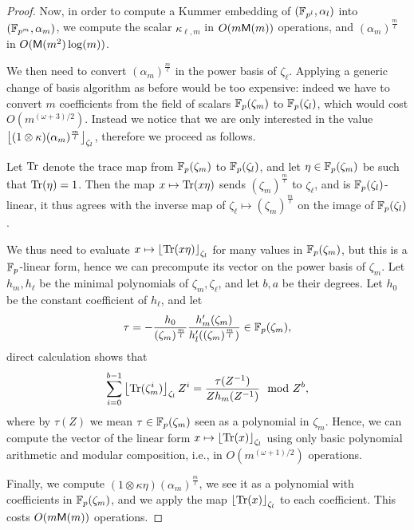 \documentclass[sigconf]{acmart}
\begin{document}
\begin{proof}
  Now, in order to compute a Kummer embedding of $(\mathbb{F}_{p^l},\alpha_l)$
  into $(\mathbb{F}_{p^m},\alpha_m)$, we compute the scalar $\kappa_{\ell,m}$
  in $O(m\mathsf{M}(m))$ operations, and $(\alpha_m)^{\frac{m}{\ell}}$ in
  $O(\mathsf{M}(m^2)\log(m))$. %

  We then need to convert $(\alpha_m)^{\frac{m}{\ell}}$ in the power
  basis of $\zeta_\ell$. %
  Applying a generic change of basis algorithm as before would be too
  expensive: indeed we have to convert $m$ coefficients from the field
  of scalars $\mathbb{F}_p(\zeta_m)$ to $\mathbb{F}_p(\zeta_l)$, which would cost
  $O(m^{(\omega+3)/2})$. %
  Instead we notice that we are only interested in the value
  $\left\lfloor (1\otimes\kappa)(\alpha_m)^{\frac{m}{l}} \right\rfloor_{\zeta_l}$,
  therefore we proceed as follows.

  Let $\mathrm{Tr}$ denote the trace map from $\mathbb{F}_p(\zeta_m)$ to
  $\mathbb{F}_p(\zeta_l)$, and let $\eta\in\mathbb{F}_p(\zeta_m)$ be such that
  $\mathrm{Tr}(\eta)=1$. %
  Then the map $x\mapsto \mathrm{Tr}(x\eta)$ sends
  $(\zeta_m)^{\frac{m}{\ell}}$ to $\zeta_\ell$, and is
  $\mathbb{F}_p(\zeta_l)$-linear, it thus agrees with the inverse map of
  $\zeta_\ell\mapsto(\zeta_m)^{\frac{m}{\ell}}$ on the image of
  $\mathbb{F}_p(\zeta_l)$. %
  
  We thus need to evaluate $x\mapsto\left\lfloor \mathrm{Tr}(x\eta) \right\rfloor_{\zeta_l}$
  for many values in $\mathbb{F}_p(\zeta_m)$, but this is a $\mathbb{F}_p$-linear
  form, hence we can precompute its vector on the power basis of
  $\zeta_m$. %
  Let $h_m,h_\ell$ be the minimal polynomials of $\zeta_m,\zeta_\ell$,
  and let $b,a$ be their degrees. %
  Let $h_0$ be the constant coefficient of $h_\ell$, and let
  \[\tau = -\frac{h_0}{(\zeta_m)^{\frac{m}{l}}} \frac{h_m'(\zeta_m)}{h_l'((\zeta_m)^{\frac{m}{l}})}\in\mathbb{F}_p(\zeta_m),\]
  direct calculation shows that
  \begin{equation*}
    \sum_{i=0}^{b-1} \left\lfloor \mathrm{Tr}(\zeta_m^i) \right\rfloor_{\zeta_l}Z^i = \frac{\tau(Z^{-1})}{Zh_m(Z^{-1})}  \mod Z^b,
  \end{equation*}
  where by $\tau(Z)$ we mean $\tau\in\mathbb{F}_p(\zeta_m)$ seen as a
  polynomial in $\zeta_m$. %
  Hence, we can compute the vector of the linear form
  $x\mapsto\left\lfloor \mathrm{Tr}(x) \right\rfloor_{\zeta_l}$ using only basic polynomial
  arithmetic and modular composition, i.e., in $O(m^{(\omega+1)/2})$
  operations.

  Finally, we compute
  $(1\otimes\kappa\eta)(\alpha_m)^{\frac{m}{\ell}}$, we see it as a
  polynomial with coefficients in $\mathbb{F}_p(\zeta_m)$, and we apply the
  map $\left\lfloor \mathrm{Tr}(x) \right\rfloor_{\zeta_l}$ to each coefficient. %
  This costs $O(m\mathsf{M}(m))$ operations.
\end{proof}
\end{document}
